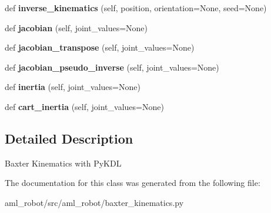 \begin{DoxyCompactItemize}
def {\bfseries inverse\+\_\+kinematics} (self, position, orientation=None, seed=None)
\item 
\hypertarget{classaml__robot_1_1baxter__kinematics_1_1baxter__kinematics_a75eb5ef7c14cf6244e0cda581529ced3}{}\label{classaml__robot_1_1baxter__kinematics_1_1baxter__kinematics_a75eb5ef7c14cf6244e0cda581529ced3} 
def {\bfseries jacobian} (self, joint\+\_\+values=None)
\item 
\hypertarget{classaml__robot_1_1baxter__kinematics_1_1baxter__kinematics_a2df86e55fdf8ff32f5ecd2ab8e11467a}{}\label{classaml__robot_1_1baxter__kinematics_1_1baxter__kinematics_a2df86e55fdf8ff32f5ecd2ab8e11467a} 
def {\bfseries jacobian\+\_\+transpose} (self, joint\+\_\+values=None)
\item 
\hypertarget{classaml__robot_1_1baxter__kinematics_1_1baxter__kinematics_a83772b20945796a2ed823a6511121231}{}\label{classaml__robot_1_1baxter__kinematics_1_1baxter__kinematics_a83772b20945796a2ed823a6511121231} 
def {\bfseries jacobian\+\_\+pseudo\+\_\+inverse} (self, joint\+\_\+values=None)
\item 
\hypertarget{classaml__robot_1_1baxter__kinematics_1_1baxter__kinematics_a9167c3e22f098e9fce0e6ae32bdb231d}{}\label{classaml__robot_1_1baxter__kinematics_1_1baxter__kinematics_a9167c3e22f098e9fce0e6ae32bdb231d} 
def {\bfseries inertia} (self, joint\+\_\+values=None)
\item 
\hypertarget{classaml__robot_1_1baxter__kinematics_1_1baxter__kinematics_a7c79fe1367b2440571d1107fc31890f7}{}\label{classaml__robot_1_1baxter__kinematics_1_1baxter__kinematics_a7c79fe1367b2440571d1107fc31890f7} 
def {\bfseries cart\+\_\+inertia} (self, joint\+\_\+values=None)
\end{DoxyCompactItemize}


\subsection{Detailed Description}
\begin{DoxyVerb}Baxter Kinematics with PyKDL
\end{DoxyVerb}
 

The documentation for this class was generated from the following file\+:\begin{DoxyCompactItemize}
\item 
aml\+\_\+robot/src/aml\+\_\+robot/baxter\+\_\+kinematics.\+py\end{DoxyCompactItemize}
